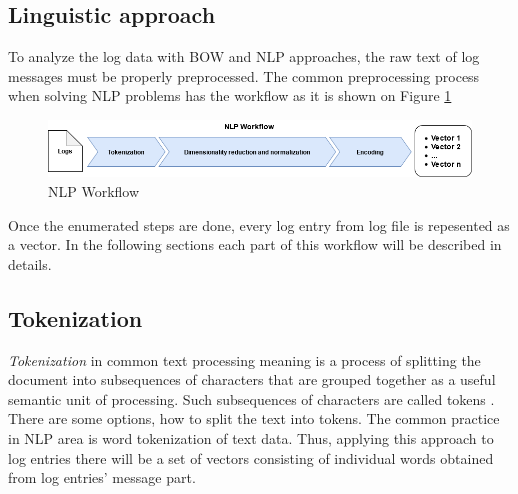 \documentclass[thesis=M,english]{FITthesis}[2019/12/23]
\begin{document}
\subsection{Linguistic approach} \label{sect:linguistic-approach}
To analyze the log data with BOW and NLP approaches, the raw text of log messages must be properly preprocessed. The common preprocessing process when solving NLP problems has the workflow as it is shown on Figure \ref{fig:nlp-workflow}%



\begin{figure}[h!]\centering
	\includegraphics[scale=0.4]{nlp_workflow}
	\caption{NLP Workflow}\label{fig:nlp-workflow}
\end{figure}
Once the enumerated steps are done, every log entry from log file is repesented as a vector. In the following sections each part of this workflow will be described in details.
\subsection{Tokenization}
\textit{Tokenization} in common text processing meaning is a process of splitting the document into subsequences of characters that are grouped together as a useful semantic unit of processing. Such subsequences of characters are called tokens \cite{tokenization-def}. There are some options, how to split the text into tokens. The common practice in NLP area is word tokenization of text data. Thus, applying this approach to log entries there will be a set of vectors consisting of individual words obtained from log entries' message part. 
\end{document}
